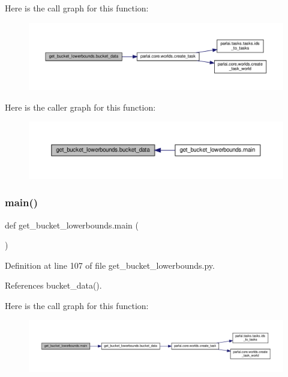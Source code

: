Here is the call graph for this function\+:
\nopagebreak
\begin{figure}[H]
\begin{center}
\leavevmode
\includegraphics[width=350pt]{namespaceget__bucket__lowerbounds_a285c382c910c7580ec319f776c3f5bb6_cgraph}
\end{center}
\end{figure}
Here is the caller graph for this function\+:
\nopagebreak
\begin{figure}[H]
\begin{center}
\leavevmode
\includegraphics[width=350pt]{namespaceget__bucket__lowerbounds_a285c382c910c7580ec319f776c3f5bb6_icgraph}
\end{center}
\end{figure}
\mbox{\label{namespaceget__bucket__lowerbounds_a1ef6ff2ea96df8bffc36ee91f108e3d2}} 
\subsubsection{\texorpdfstring{main()}{main()}}
{\footnotesize\ttfamily def get\+\_\+bucket\+\_\+lowerbounds.\+main (\begin{DoxyParamCaption}{ }\end{DoxyParamCaption})}



Definition at line 107 of file get\+\_\+bucket\+\_\+lowerbounds.\+py.



References bucket\+\_\+data().

Here is the call graph for this function\+:
\nopagebreak
\begin{figure}[H]
\begin{center}
\leavevmode
\includegraphics[width=350pt]{namespaceget__bucket__lowerbounds_a1ef6ff2ea96df8bffc36ee91f108e3d2_cgraph}
\end{center}
\end{figure}
